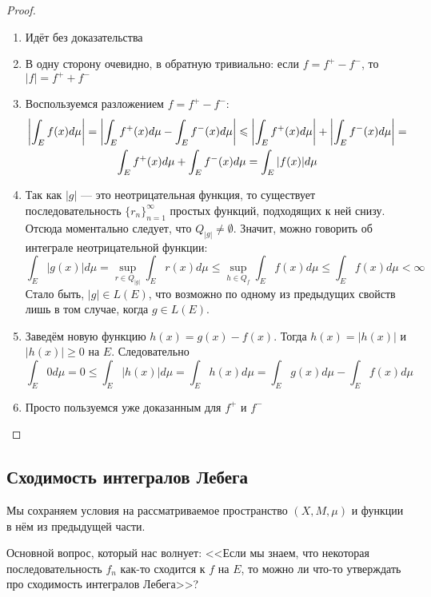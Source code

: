\begin{proof}~
	\begin{enumerate}
		\item Идёт без доказательства
		
		\item В одну сторону очевидно, в обратную тривиально: если $f = f^+ - f^-$, то $|f| = f^+ + f^-$
		
		\item Воспользуемся разложением $f = f^+ - f^-$:
		\begin{multline*}
			\left|\int_E f(x)d\mu\right| = \left|\int_E f^+(x)d\mu - \int_E f^-(x)d\mu\right| \leqslant \left|\int_E f^+(x)d\mu\right| + \left|\int_E f^-(x)d\mu\right| =
			\\
			\int_E f^+(x)d\mu + \int_E f^-(x)d\mu = \int_E |f(x)|d\mu
		\end{multline*}
		
		\item Так как $|g|$ --- это неотрицательная функция, то существует последовательность $\{r_n\}_{n = 1}^\infty$ простых функций, подходящих к ней снизу. Отсюда моментально следует, что $Q_{|g|} \neq \emptyset$. Значит, можно говорить об интеграле неотрицательной функции:
		\[
			\int_E |g(x)|d\mu = \sup_{r \in Q_{|g|}} \int_E r(x)d\mu \le \sup_{h \in Q_f} \int_E f(x)d\mu \le \int_E f(x)d\mu < \infty
		\]
		Стало быть, $|g| \in L(E)$, что возможно по одному из предыдущих свойств лишь в том случае, когда $g \in L(E)$.
		
		\item Заведём новую функцию $h(x) = g(x) - f(x)$. Тогда $h(x) = |h(x)|$ и $|h(x)| \ge 0$ на $E$. Следовательно
		\[
			\int_E 0d\mu = 0 \le \int_E |h(x)|d\mu = \int_E h(x)d\mu = \int_E g(x)d\mu - \int_E f(x)d\mu
		\]
		
		\item Просто пользуемся уже доказанным для $f^+$ и $f^-$
	\end{enumerate}
\end{proof}

\subsection{Сходимость интегралов Лебега}

\begin{note}
	Мы сохраняем условия на рассматриваемое пространство $(X, M, \mu)$ и функции в нём из предыдущей части.
\end{note}

\begin{note}
	Основной вопрос, который нас волнует: <<Если мы знаем, что некоторая последовательность $f_n$ как-то сходится к $f$ на $E$, то можно ли что-то утверждать про сходимость интегралов Лебега>>?
\end{note}

